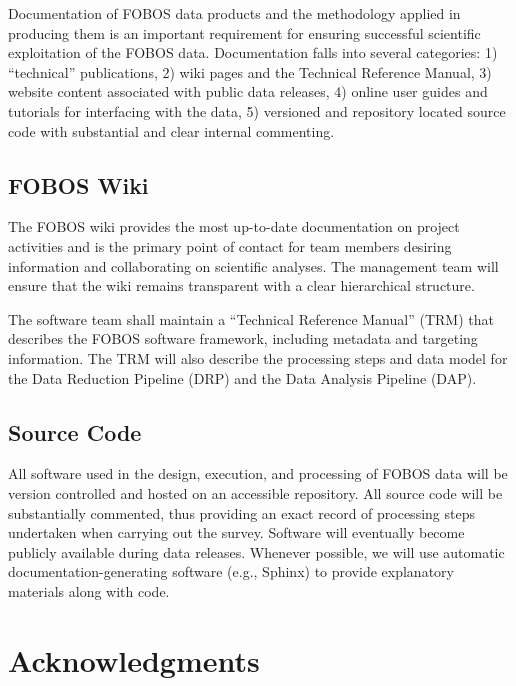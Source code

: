 \documentclass[11pt,a4paper,twoside,onecolumn,openany,final,oldfontcommands]{memoir}
\begin{document}

Documentation of FOBOS data products and the methodology applied in producing them is an important requirement for ensuring successful scientific exploitation of the FOBOS data.  Documentation falls into several categories: 1) ``technical'' publications, 2) wiki pages and the Technical Reference Manual, 3) website content associated with public data releases, 4) online user guides and tutorials for interfacing with the data, 5) versioned and repository located source code with substantial and clear internal commenting.  

\section{FOBOS Wiki}

The FOBOS wiki provides the most up-to-date documentation on project activities and is the primary point of contact for team members desiring information and collaborating on scientific analyses.  The management team will ensure that the wiki remains transparent with a clear hierarchical structure.

The software team shall maintain a ``Technical Reference Manual'' (TRM) that describes the FOBOS software framework, including metadata and targeting information.  The TRM will also describe the processing steps and data model for the Data Reduction Pipeline (DRP) and the Data Analysis Pipeline (DAP).  


\section{Source Code}

All software used in the design, execution, and processing of FOBOS data will be version controlled and hosted on an accessible repository.  All source code will be substantially commented, thus providing an exact record of processing steps undertaken when carrying out the survey.  Software will eventually become publicly available during data releases.  Whenever possible, we will use automatic documentation-generating software (e.g., Sphinx) to provide explanatory materials along with code. 

\newpage

\chapter*{Acknowledgments}
\end{document}
